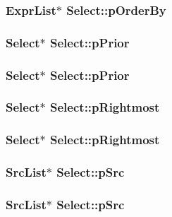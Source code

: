 \subsubsection{\setlength{\rightskip}{0pt plus 5cm}\bf{Expr\-List}$\ast$ \bf{Select::p\-Order\-By}}\label{structSelect_f3036cfd73ce99d65646a5bfdedfd817}


\subsubsection{\setlength{\rightskip}{0pt plus 5cm}\bf{Select}$\ast$ \bf{Select::p\-Prior}}\label{structSelect_94456d303ca1b9dafff4edcdbc9678c0}


\subsubsection{\setlength{\rightskip}{0pt plus 5cm}\bf{Select}$\ast$ \bf{Select::p\-Prior}}\label{structSelect_94456d303ca1b9dafff4edcdbc9678c0}


\subsubsection{\setlength{\rightskip}{0pt plus 5cm}\bf{Select}$\ast$ \bf{Select::p\-Rightmost}}\label{structSelect_ee5dd6de432374a22cd2f99f426cc327}


\subsubsection{\setlength{\rightskip}{0pt plus 5cm}\bf{Select}$\ast$ \bf{Select::p\-Rightmost}}\label{structSelect_ee5dd6de432374a22cd2f99f426cc327}


\subsubsection{\setlength{\rightskip}{0pt plus 5cm}\bf{Src\-List}$\ast$ \bf{Select::p\-Src}}\label{structSelect_f24ef7707cd5c1a47796bed1c6bd3789}


\subsubsection{\setlength{\rightskip}{0pt plus 5cm}\bf{Src\-List}$\ast$ \bf{Select::p\-Src}}\label{structSelect_f24ef7707cd5c1a47796bed1c6bd3789}


